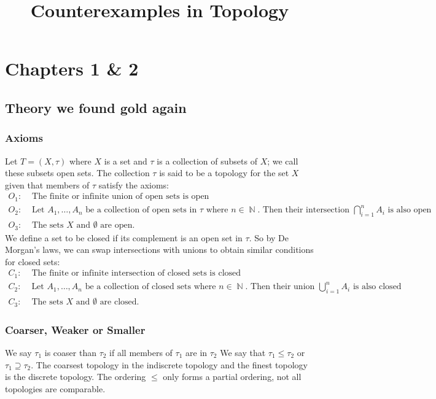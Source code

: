 \documentclass{article}
\title{Counterexamples in Topology}
\DeclareMathOperator\N{\mathbb{N}}
\begin{document}
\maketitle{}
\newpage{}
\section{Chapters 1 \& 2}
\subsection{Theory we found gold again}
\subsubsection{Axioms}
Let $T = (X, \tau)$ where $X$ is a set and $\tau$
is a collection of subsets of $X$; we call these subsets open sets. The collection
$\tau$ is said to be a topology for the set $X$ given that members of $\tau$ satisfy the axioms:
\begin{align*}
O_1: & \text{ The finite or infinite union of open sets is open} \\
O_2: & \text{ Let $A_1,\hdots,A_n$ be a
 collection of open sets in $\tau$ where $n \in \N$.
  Then their intersection $\bigcap_{i=1}^n A_i$ is also open} \\
O_3: & \text{ The sets $X$ and $\emptyset$ are open.}
\end{align*}
We define a set to be closed if its complement is an open set in $\tau$.
So by De Morgan's laws, we can swap intersections with unions to obtain
similar conditions for closed sets:
\begin{align*}
C_1: & \text{ The finite or infinite intersection of closed sets is closed} \\
C_2: & \text{ Let $A_1,\hdots,A_n$ be a
 collection of closed sets where $n \in \N$.
  Then their union $\bigcup_{i=1}^n A_i$ is also closed} \\
C_3: & \text{ The sets $X$ and $\emptyset$ are closed.}
\end{align*}
\subsubsection{Coarser, Weaker or Smaller}
We say $\tau_1$ is coaser than $\tau_2$ if all members of $\tau_1$ are in $\tau_2$
We say that $\tau_1 \leq \tau_2$ or $\tau_1 \supseteq \tau_2$. The coarsest topology in the indiscrete topology
and the finest topology is the discrete topology. The ordering $\leq$ only forms a partial ordering, not all topologies are comparable.
\end{document}
